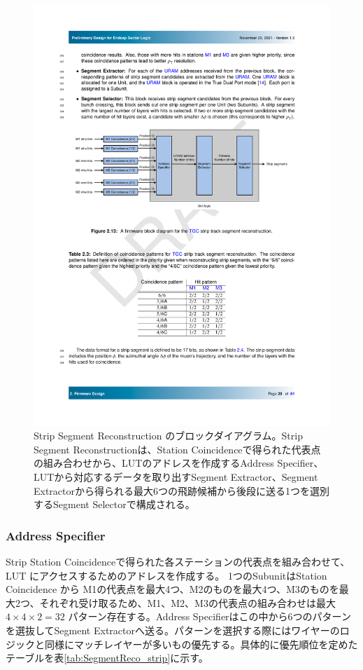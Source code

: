 \begin{figure} 
\centering
\includegraphics[width=16cm]{fig/SL/SegReco_strip.pdf}
\caption[Strip Segment Reconstruction のブロックダイアグラム]{Strip Segment Reconstruction のブロックダイアグラム\cite{SLPDR}。Strip Segment Reconstructionは、Station Coincidenceで得られた代表点の組み合わせから、LUTのアドレスを作成するAddress Specifier、LUTから対応するデータを取り出すSegment Extractor、Segment Extractorから得られる最大6つの飛跡候補から後段に送る1つを選別するSegment Selectorで構成される。}
\label{SegReco_strip}
\end{figure}

\subsubsection*{Address Specifier}
Strip Station Coincidenceで得られた各ステーションの代表点を組み合わせて、LUT にアクセスするためのアドレスを作成する。
1つのSubunitはStation Coincidence から M1の代表点を最大4つ、M2のものを最大4つ、M3のものを最大2つ、それぞれ受け取るため、M1、M2、M3の代表点の組み合わせは最大$4 \times 4 \times 2 = 32$ パターン存在する。Address Specifierはこの中から6つのパターンを選抜してSegment Extractorへ送る。パターンを選択する際にはワイヤーのロジックと同様にマッチレイヤーが多いもの優先する。具体的に優先順位を定めたテーブルを表\ref{tab:SegmentReco_strip}に示す。


